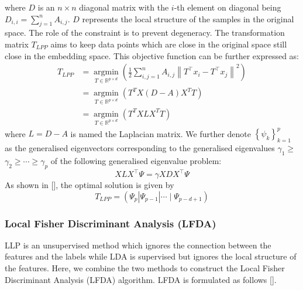 \documentclass[a4paper,12pt]{article}
\begin{document}
where $D$ is an $n \times n$ diagonal matrix with the $i$-th element on diagonal being $D_{i, i} = \sum_{j=1}^{n} A_{i, j}$. $D$ represents the local structure of the samples in the original space. The role of the constraint is to prevent degeneracy. The transformation matrix $T_{L P P}$ aims to keep data points which are close in the original space still close in the embedding space. This objective function can be further expressed as:
\begin{align*}
T_{L P P} & = \underset{T \in \mathbb{R}^{p \times d}}{\operatorname{argmin}}\left(\frac{1}{2} \sum_{i, j=1}^{n} A_{i, j}\left\|T^{\top} x_{i}-T^{\top} x_{j}\right\|^{2}\right) \\
& =  \underset{T \in \mathbb{R}^{p \times d}}{\operatorname{argmin}} \left( T^{T}X(D-A)X^{T}T \right) \\
& = \underset{T \in \mathbb{R}^{p \times d}}{\operatorname{argmin}} \left( T^{T}XLX^{T}T \right)
\end{align*}
where $L = D - A$ is named the Laplacian matrix. We further denote $\left\{\psi_{k}\right\}_{k=1}^{p}$ as the generalised eigenvectors corresponding to the generalised eigenvalues $\gamma_{1} \geq$ $\gamma_{2} \geq \cdots \geq \gamma_{p}$ of the following generalised eigenvalue problem:
\begin{equation*}
X L X^{\top} \Psi=\gamma X D X^{\top} \Psi
\end{equation*}
As shown in [\cite{he2004locality}], the optimal solution is given by 
\begin{equation*}
T_{L P P}=\left(\Psi_{p}\left|\Psi_{p-1}\right| \cdots \mid \Psi_{p-d+1}\right)
\end{equation*}

\subsubsection{Local Fisher Discriminant Analysis (LFDA)}
LLP is an unsupervised method which ignores the connection between the features and the labels while LDA is supervised but ignores the local structure of the features. Here, we combine the two methods to construct the Local Fisher Discriminant Analysis (LFDA) algorithm. LFDA is formulated as follows [\cite{sugiyama2007dimensionality}].
\end{document}
